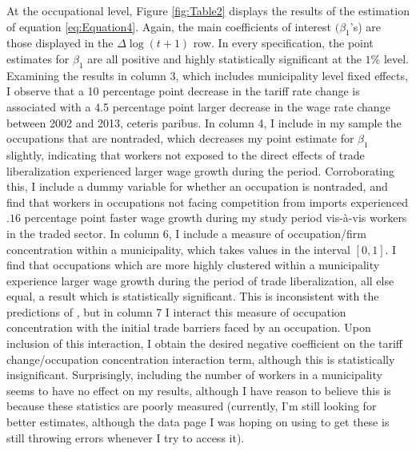 \documentclass[12pt]{article}
\begin{document}
At the occupational level, Figure \ref{fig:Table2} displays the results of the estimation of equation 
\ref{eq:Equation4}. Again, the main coefficients of interest $(\beta_1$'s) are those displayed in the 
$\Delta\log(t+1)$ row. In every specification, the point estimates for $\beta_1$ are all positive
and highly statistically significant at the $1\%$ level. Examining the results in column 3, which
includes municipality level fixed effects, I observe that a 10 percentage point decrease in the tariff 
rate change is associated with a 4.5 percentage point larger decrease in the wage rate change between 
2002 and 2013, ceteris paribus. In column 4, I include in my sample the occupations that are nontraded,
which decreases my point estimate for $\beta_1$ slightly, indicating that workers not exposed to 
the direct effects of trade liberalization experienced larger wage growth during the period. 
Corroborating
this, I include a dummy variable for whether an occupation is nontraded, and find that workers in
occupations not facing competition from imports experienced $.16$ percentage point faster wage growth
during my study period vis-\`{a}-vis workers in the traded sector. In column 6, I include a measure of occupation/firm concentration within a
municipality, which takes values in the interval $[0,1]$. I find that occupations which are more highly 
clustered within a municipality experience larger wage growth during the period of trade liberalization, 
all else equal, a result which is statistically significant. This is inconsistent with the 
predictions of \citet{holmes1}, but in column 7 I interact this measure
of occupation concentration with the initial trade barriers faced by an occupation.
Upon inclusion of this interaction, I obtain the desired negative coefficient on the tariff
change/occupation concentration interaction term, although this is statistically insignificant.
Surprisingly, including the number of workers in a municipality seems to have no effect on my
results, although I have reason to believe this is because these statistics are poorly measured 
(currently, I'm still looking for better estimates, although the data page I was hoping on using to
get these is still throwing errors whenever I try to access it).
\end{document}
